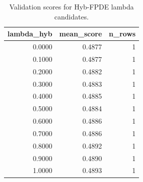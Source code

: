 \begin{table}[t]
\caption{Validation scores for Hyb-FPDE lambda candidates.}
\label{tab:lambda_distribution_computed}
\centering
\begin{tabular}{rrr}
\toprule
lambda\_hyb & mean\_score & n\_rows \\
\midrule
0.0000 & 0.4877 & 1 \\
0.1000 & 0.4877 & 1 \\
0.2000 & 0.4882 & 1 \\
0.3000 & 0.4883 & 1 \\
0.4000 & 0.4885 & 1 \\
0.5000 & 0.4884 & 1 \\
0.6000 & 0.4886 & 1 \\
0.7000 & 0.4886 & 1 \\
0.8000 & 0.4892 & 1 \\
0.9000 & 0.4890 & 1 \\
1.0000 & 0.4893 & 1 \\
\bottomrule
\end{tabular}

\end{table}
